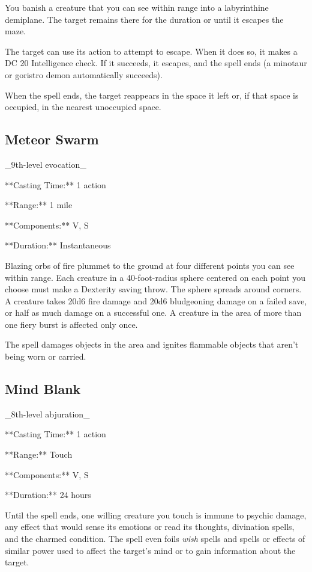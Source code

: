 You banish a creature that you can see within range into a labyrinthine demiplane. The target remains there for the duration or until it escapes the maze.

The target can use its action to attempt to escape. When it does so, it makes a DC 20 Intelligence check. If it succeeds, it escapes, and the spell ends (a minotaur or goristro demon automatically succeeds).

When the spell ends, the target reappears in the space it left or, if that space is occupied, in the nearest unoccupied space.

\subsection{Meteor Swarm}

_9th-level evocation_

**Casting Time:** 1 action

**Range:** 1 mile

**Components:** V, S

**Duration:** Instantaneous

Blazing orbs of fire plummet to the ground at four different points you can see within range. Each creature in a 40-foot-radius sphere centered on each point you choose must make a Dexterity saving throw. The sphere spreads around corners. A creature takes 20d6 fire damage and 20d6 bludgeoning damage on a failed save, or half as much damage on a successful one. A creature in the area of more than one fiery burst is affected only once.

The spell damages objects in the area and ignites flammable objects that aren’t being worn or carried.

\subsection{Mind Blank}

_8th-level abjuration_

**Casting Time:** 1 action

**Range:** Touch

**Components:** V, S

**Duration:** 24 hours

Until the spell ends, one willing creature you touch is immune to psychic damage, any effect that would sense its emotions or read its thoughts, divination spells, and the charmed condition. The spell even foils \textit{wish} spells and spells or effects of similar power used to affect the target’s mind or to gain information about the target.

